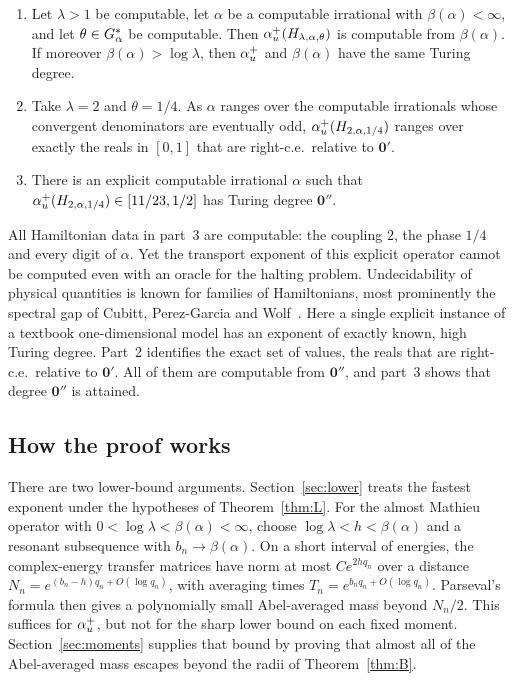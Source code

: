 \begin{maintheorem}[Computability]\label{thm:D}
\begin{enumerate}
\item Let $\lambda>1$ be computable, let $\alpha$ be a computable irrational with $\beta(\alpha)<\infty$, and let $\theta\in G_\alpha^*$ be computable. Then $\alpha_u^+(H_{\lambda,\alpha,\theta})$ is computable from $\beta(\alpha)$. If moreover $\beta(\alpha)>\log\lambda$, then $\alpha_u^+$ and $\beta(\alpha)$ have the same Turing degree.
\item Take $\lambda=2$ and $\theta=1/4$. As $\alpha$ ranges over the computable irrationals whose convergent denominators are eventually odd, $\alpha_u^+(H_{2,\alpha,1/4})$ ranges over exactly the reals in $[0,1]$ that are right-c.e.\ relative to $\mathbf 0'$.
\item There is an explicit computable irrational $\alpha$ such that $\alpha_u^+(H_{2,\alpha,1/4})\in[11/23,1/2]$ has Turing degree $\mathbf 0''$.
\end{enumerate}
\end{maintheorem}

All Hamiltonian data in part~3 are computable: the coupling $2$, the phase $1/4$ and every digit of $\alpha$. Yet the transport exponent of this explicit operator cannot be computed even with an oracle for the halting problem. Undecidability of physical quantities is known for families of Hamiltonians, most prominently the spectral gap of Cubitt, Perez-Garcia and Wolf~\cite{CPGW2015}. Here a single explicit instance of a textbook one-dimensional model has an exponent of exactly known, high Turing degree. Part~2 identifies the exact set of values, the reals that are right-c.e.\ relative to $\mathbf 0'$. All of them are computable from $\mathbf 0''$, and part~3 shows that degree $\mathbf 0''$ is attained.

\subsection{How the proof works}

There are two lower-bound arguments. Section~\ref{sec:lower} treats the fastest exponent under the hypotheses of Theorem~\ref{thm:L}. For the almost Mathieu operator with $0<\log\lambda<\beta(\alpha)<\infty$, choose $\log\lambda<h<\beta(\alpha)$ and a resonant subsequence with $b_n\to\beta(\alpha)$. On a short interval of energies, the complex-energy transfer matrices have norm at most $Ce^{2hq_n}$ over a distance $N_n=e^{(b_n-h)q_n+O(\log q_n)}$, with averaging times $T_n=e^{b_nq_n+O(\log q_n)}$. Parseval's formula then gives a polynomially small Abel-averaged mass beyond $N_n/2$. This suffices for $\alpha_u^+$, but not for the sharp lower bound on each fixed moment. Section~\ref{sec:moments} supplies that bound by proving that almost all of the Abel-averaged mass escapes beyond the radii of Theorem~\ref{thm:B}.

